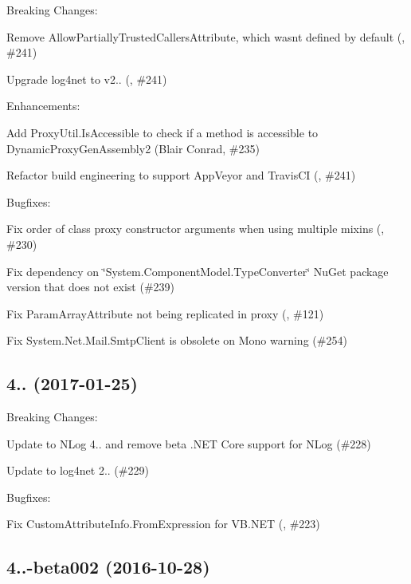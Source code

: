 Breaking Changes\+:
\begin{DoxyItemize}
\item Remove Allow\+Partially\+Trusted\+Callers\+Attribute, which wasn\textquotesingle{}t defined by default (, \#241)
\item Upgrade log4net to v2.. (, \#241)
\end{DoxyItemize}

Enhancements\+:
\begin{DoxyItemize}
\item Add Proxy\+Util.\+Is\+Accessible to check if a method is accessible to Dynamic\+Proxy\+Gen\+Assembly2 (Blair Conrad, \#235)
\item Refactor build engineering to support App\+Veyor and Travis\+CI (, \#241)
\end{DoxyItemize}

Bugfixes\+:
\begin{DoxyItemize}
\item Fix order of class proxy constructor arguments when using multiple mixins (, \#230)
\item Fix dependency on \char`\"{}\+System.\+Component\+Model.\+Type\+Converter\char`\"{} Nu\+Get package version that does not exist (\#239)
\item Fix Param\+Array\+Attribute not being replicated in proxy (, \#121)
\item Fix System.\+Net.\+Mail.\+Smtp\+Client is obsolete on Mono warning (\#254)
\end{DoxyItemize}

\subsection*{4.. (2017-\/01-\/25)}

Breaking Changes\+:
\begin{DoxyItemize}
\item Update to N\+Log 4.. and remove beta .N\+ET Core support for N\+Log (\#228)
\item Update to log4net 2.. (\#229)
\end{DoxyItemize}

Bugfixes\+:
\begin{DoxyItemize}
\item Fix Custom\+Attribute\+Info.\+From\+Expression for V\+B.\+N\+ET (, \#223)
\end{DoxyItemize}

\subsection*{4..-\/beta002 (2016-\/10-\/28)}

